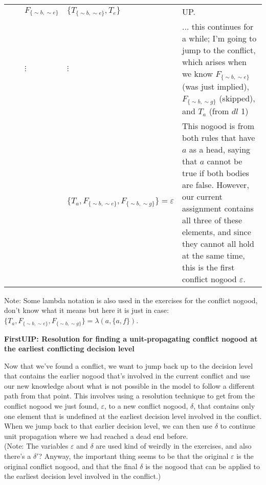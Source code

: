 \documentclass[9pt,a4paper,landscape]{article}
\newcommand{\ngtb}[1]{T_{ \{#1\} }}
\newcommand{\ngfb}[1]{F_{ \{#1\} }}
\newcommand{\ngta}[1]{T_{#1}}
\begin{document}
{\begin{center}
\begin{tabular}{l|ll|l|p{15cm}}
	  &				& $\ngfb{{\sim} b, {\sim} e}$ & $\{ \ngtb{{\sim} b, {\sim} e}, \ngta{e} \}$ & UP. \\
	  &				& $\vdots$ &  $\vdots$ & ... this continues for a while; I'm going to jump to the conflict, which arises when we know $\ngfb{{\sim} b, {\sim} e}$ (was just implied), $\ngfb{{\sim} b, {\sim} g}$ (skipped), and $\ngta{a}$ (from $dl$ 1) \\
	  &				& & $\{ \ngta{a}, \ngfb{{\sim} b, {\sim} e}, \ngfb{{\sim} b, {\sim} g} \} = \varepsilon$ & This nogood is from both rules that have $a$ as a head, saying that $a$ cannot be true if both bodies are false. However, our current assignment contains all three of these elements, and since they cannot all hold at the same time, this is the first conflict nogood $\varepsilon$. \\
\end{tabular}
\end{center}

Note: Some lambda notation is also used in the exercises for the conflict nogood, don't know what it means but here it is just in case: $\{ \ngta{a}, \ngfb{{\sim} b, {\sim} e}, \ngfb{{\sim} b, {\sim} g} \} = \lambda(a, \{a, f\})$.




\pagebreak


\textbf{FirstUIP: Resolution for finding a unit-propagating conflict nogood at the earliest conflicting decision level}

Now that we've found a conflict, we want to jump back up to the decision level that contains the earlier nogood that's involved in the current conflict and use our new knowledge about what is not possible in the model to follow a different path from that point.
This involves using a resolution technique to get from the conflict nogood we just found, $\varepsilon$, to a new conflict nogood, $\delta$, that contains only one element that is undefined at the earliest decision level involved in the conflict.
When we jump back to that earlier decision level, we can then use $\delta$ to continue unit propagation where we had reached a dead end before.\\

(Note: The variables $\varepsilon$ and $\delta$ are used kind of weirdly in the exercises, and also there's a $\delta'$? Anyway, the important thing seems to be that the original $\varepsilon$ is the original conflict nogood, and that the final $\delta$ is the nogood that can be applied to the earliest decision level involved in the conflict.)\\

}
\end{document}
